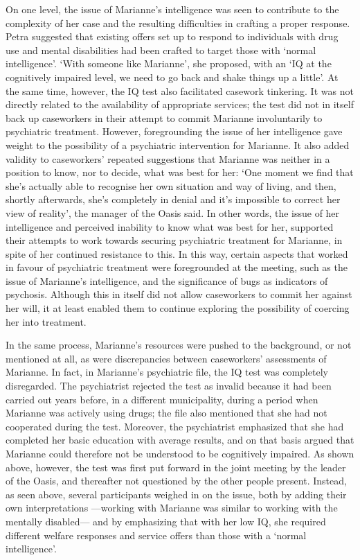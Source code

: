 On one level, the issue of Marianne’s intelligence was seen to contribute to the complexity of her case and the resulting difficulties in crafting a proper response. Petra suggested that existing offers set up to respond to individuals with drug use and mental disabilities had been crafted to target those with ‘normal intelligence’. ‘With someone like Marianne’, she proposed, with an ‘IQ at the cognitively impaired level, we need to go back and shake things up a little’. At the same time, however, the IQ test also facilitated casework tinkering. It was not directly related to the availability of appropriate services; the test did not in itself back up caseworkers in their attempt to commit Marianne involuntarily to psychiatric treatment. However, foregrounding the issue of her intelligence gave weight to the possibility of a psychiatric intervention for Marianne. It also added validity to caseworkers’ repeated suggestions that Marianne was neither in a position to know, nor to decide, what was best for her: ‘One moment we find that she’s actually able to recognise her own situation and way of living, and then, shortly afterwards, she’s completely in denial and it’s impossible to correct her view of reality’, the manager of the Oasis said. In other words, the issue of her intelligence and perceived inability to know what was best for her, supported their attempts to work towards securing psychiatric treatment for Marianne, in spite of her continued resistance to this. In this way, certain aspects that worked in favour of psychiatric treatment were foregrounded at the meeting, such as the issue of Marianne’s intelligence, and the significance of bugs as indicators of psychosis. Although this in itself did not allow caseworkers to commit her against her will, it at least enabled them to continue exploring the possibility of coercing her into treatment.
\par
In the same process, Marianne’s resources were pushed to the background, or not mentioned at all, as were discrepancies between caseworkers’ assessments of Marianne. In fact, in Marianne’s psychiatric file, the IQ test was completely disregarded. The psychiatrist rejected the test as invalid because it had been carried out years before, in a different municipality, during a period when Marianne was actively using drugs; the file also mentioned that she had not cooperated during the test. Moreover, the psychiatrist emphasized that she had completed her basic education with average results, and on that basis argued that Marianne could therefore not be understood to be cognitively impaired. As shown above, however, the test was first put forward in the joint meeting by the leader of the Oasis, and thereafter not questioned by the other people present. Instead, as seen above, several participants weighed in on the issue, both by adding their own interpretations ---working with Marianne was similar to working with the mentally disabled--- and by emphasizing that with her low IQ, she required different welfare responses and service offers than those with a ‘normal intelligence’.

